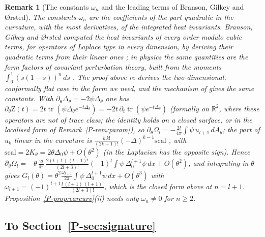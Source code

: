 \documentclass[pdflatex,sn-mathphys-num]{sn-jnl}
\newcommand{\cZ}{\mathrm{Z}}
\newcommand{\R}{\mathbb{R}}
\newcommand{\pref}[1]{\ref*{P-#1}}%
\theoremstyle{thmstyleone}%
\theoremstyle{thmstylethree}%
\newtheorem{remark}[proposition]{Remark}%
\providecommand{\R}{\mathbb{R}}
\providecommand{\cZ}{\mathrm{Z}}
\begin{document}
\begin{remark}[The constants $\omega_n$ and the leading terms of Branson, Gilkey and \O rsted]\label{rem:bgo}
The constants $\omega_n$ are the coefficients of the part quadratic in the curvature, with the most derivatives, of the integrated heat invariants. Branson, Gilkey and \O rsted computed the heat invariants of every order modulo cubic terms, for operators of Laplace type in every dimension, by deriving their quadratic terms from their linear ones \cite{bgo1990}; in physics the same quantities are the form factors of covariant perturbation theory, built from the moments $\int_0^1(s(1-s))^n\,ds$ \cite[\S8.2]{vassilevich2003}. The proof above re-derives the two-dimensional, conformally flat case in the form we need, and the mechanism of \cite{bgo1990} gives the same constants. With $\partial_\theta\Delta_\theta=-2\psi\Delta_\theta$ one has $\partial_\theta\cZ(t)=2t\operatorname{tr}(\psi\Delta_\theta e^{-t\Delta_\theta})=-2t\,\partial_t\operatorname{tr}(\psi e^{-t\Delta_\theta})$ (formally on $\R^2$, where these operators are not of trace class; the identity holds on a closed surface, or in the localised form of Remark~\pref{rem:param}), so $\partial_\theta\Omega_l=-\frac{2l}{4\pi}\int\psi\,u_{l+1}\,dA_\theta$; the part of $u_k$ linear in the curvature is $\frac{k\,k!}{(2k+1)!}(-\Delta)^{k-1}\mathrm{scal}$ \cite[(8.3)--(8.4)]{vassilevich2003}, with $\mathrm{scal}=2K_\theta=2\theta\Delta_0\psi+O(\theta^2)$ (in \cite{vassilevich2003} the Laplacian has the opposite sign). Hence $\partial_\theta\Omega_l=-\theta\,\frac{2l}{4\pi}\,\frac{2(l+1)\,(l+1)!}{(2l+3)!}(-1)^l\int\psi\,\Delta_0^{l+1}\psi\,dx+O(\theta^2)$, and integrating in $\theta$ gives $G_l(\theta)=\theta^2\frac{\omega_{l+1}}{2\pi}\int\psi\,\Delta_0^{l+1}\psi\,dx+O(\theta^3)$ with $\omega_{l+1}=(-1)^{l+1}\frac{l\,(l+1)\,(l+1)!}{(2l+3)!}$, which is the closed form above at $n=l+1$. Proposition~\pref{prop:varcurv}(ii) needs only $\omega_n\ne0$ for $n\ge2$.
\end{remark}

\subsection*{To Section~\pref{sec:signature}}
\end{document}
